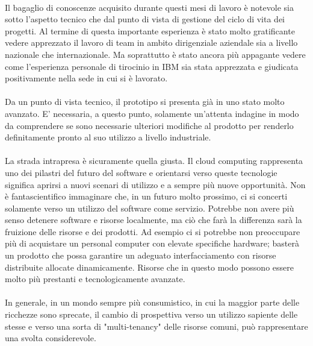 \paragraph{}
Il bagaglio di conoscenze acquisito durante questi mesi di lavoro è notevole sia sotto l'aspetto tecnico che dal punto di vista di gestione del ciclo di vita dei progetti. Al termine di questa importante esperienza è stato molto gratificante vedere apprezzato il lavoro di team in ambito dirigenziale aziendale sia a livello nazionale che internazionale. Ma soprattutto è stato ancora più appagante vedere come l'esperienza personale di tirocinio in IBM sia stata apprezzata e giudicata positivamente nella sede in cui si è lavorato.

\paragraph{}
Da un punto di vista tecnico, il prototipo si presenta già in uno stato molto avanzato. E' necessaria, a questo punto, solamente un'attenta indagine in modo da comprendere se sono necessarie ulteriori modifiche al prodotto per renderlo definitamente pronto al suo utilizzo a livello industriale.
\paragraph{}
La strada intrapresa è sicuramente quella giusta. Il cloud computing rappresenta uno dei pilastri del futuro del software e orientarsi verso queste tecnologie significa aprirsi a nuovi scenari di utilizzo e a sempre più nuove opportunità. Non è fantascientifico immaginare che, in un futuro molto prossimo, ci si concerti solamente verso un utilizzo del software come servizio. Potrebbe non avere più senso detenere software e risorse localmente, ma ciò che farà la differenza sarà la fruizione delle risorse e dei prodotti. Ad esempio ci si potrebbe non preoccupare più di acquistare un personal computer con elevate specifiche hardware; basterà un prodotto che possa garantire un adeguato interfacciamento con risorse distribuite allocate dinamicamente. Risorse che in questo modo possono essere molto più prestanti e tecnologicamente avanzate.
\paragraph{}
In generale, in un mondo sempre più consumistico, in cui la maggior parte delle ricchezze sono sprecate, il cambio di prospettiva verso un utilizzo sapiente delle stesse e verso una sorta di "multi-tenancy" delle risorse comuni, può rappresentare una svolta considerevole.